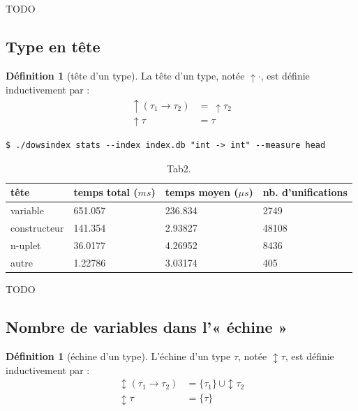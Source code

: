 \documentclass[a4paper]{report}
\theoremstyle{definition}
\newtheorem{definition}[theoreme]{Définition}
\begin{document}
TODO


\subsection{Type en tête}

\begin{definition}[tête d'un type]
	La tête d'un type, notée $\uparrow \cdot$, est définie inductivement par :
	\begin{align*}
			\uparrow (\tau_1 \rightarrow \tau_2) &=\ \uparrow \tau_2
		\\
			\uparrow \tau &= \tau
	\end{align*}
\end{definition}

\begin{verbatim}
$ ./dowsindex stats --index index.db "int -> int" --measure head
\end{verbatim}

\begin{table}[h]
	\centering
	\begin{tabular}{|l|l|l|l|}
		\hline
			tête &
			temps total ($ms$) &
			temps moyen ($\mu s$) &
			nb. d'unifications
		\\
		\hline
			variable & 651.057 & 236.834 & 2749
		\\
			constructeur & 141.354 & 2.93827 & 48108
		\\
			n-uplet & 36.0177 & 4.26952 & 8436
		\\
			autre & 1.22786 & 3.03174 & 405
		\\
		\hline
	\end{tabular}
	\caption{\label{tab1} Tab2.}
\end{table}

TODO


\subsection{Nombre de variables dans l'« échine »}

\begin{definition}[échine d'un type]
	L'échine d'un type $\tau$, notée $\updownarrow \tau$, est définie inductivement par :
	\begin{align*}
			\updownarrow (\tau_1 \rightarrow \tau_2) &=
			\{ \tau_1 \} \,\cup \updownarrow \tau_2
		\\
			\updownarrow \tau &=
			\{ \tau \}
	\end{align*}
\end{definition}
\end{document}
